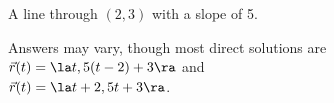 {A line through $(2,3)$ with a slope of 5. 
}
{
Answers may vary, though most direct solutions are \\
$\vec r(t) = \la t,5(t-2)+3\ra $ and \\
$\vec r(t) = \la t+2,5t+3\ra$.

}

